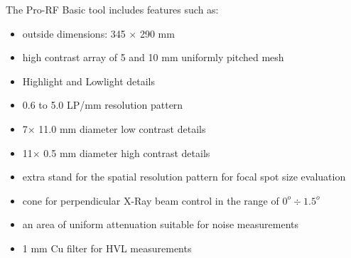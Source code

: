 The Pro-RF Basic tool includes features such as:
\begin{itemize}
    \item outside dimensions: 345 $\times$ 290 mm
    \item high contrast array of 5 and 10 mm uniformly pitched mesh
    \item Highlight and Lowlight details
    \item 0.6 to 5.0 LP/mm resolution pattern
    \item 7$\times$ 11.0 mm diameter low contrast details
    \item 11$\times$ 0.5 mm diameter high contrast details
    \item extra stand for the spatial resolution pattern for focal spot size evaluation
    \item cone for perpendicular X-Ray beam control in the range of $0^o \div 1.5^o$
    \item an area of uniform attenuation suitable for noise measurements
    \item 1 mm Cu filter for HVL measurements    
\end{itemize}
